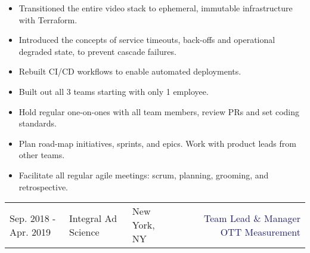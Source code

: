 \documentclass{article}
\begin{document}
\begin{multicols}{2}
\begin{small}
\begin{itemize}[leftmargin=*,label=\tiny{$\bullet$}]
    \item\begin{minipage}[t]{\linewidth}{Transitioned the entire video stack to ephemeral, immutable infrastructure with Terraform.}\end{minipage}
    \item\begin{minipage}[t]{\linewidth}{Introduced the concepts of service timeouts, back-offs and operational degraded state, to prevent cascade failures.}\end{minipage}
    \item\begin{minipage}[t]{\linewidth}{Rebuilt CI/CD workflows to enable automated deployments.}\end{minipage}
    \item\begin{minipage}[t]{\linewidth}{Built out all 3 teams starting with only 1 employee.}\end{minipage}
    \item\begin{minipage}[t]{\linewidth}{Hold regular one-on-ones with all team members, review PRs and set coding standards.}\end{minipage}
    \item\begin{minipage}[t]{\linewidth}{Plan road-map initiatives, sprints, and epics. Work with product leads from other teams.}\end{minipage}
    \item\begin{minipage}[t]{\linewidth}{Facilitate all regular agile meetings: scrum, planning, grooming, and retrospective.}\end{minipage}
    \end{itemize}
  \end{small} 
\end{multicols}

\vspace{15pt}\begin{tabularx}{\textwidth}{@{}lllXr@{}}
  Sep. 2018 - Apr. 2019&\textcolor{Mahogany}{Integral Ad Science}&\textcolor{Black!80}{New York, NY}&&
  \begin{minipage}[t]{1.9in}{\textcolor{MidnightBlue}{Team Lead \& Manager OTT Measurement}}\end{minipage}
\end{tabularx}
\end{document}
